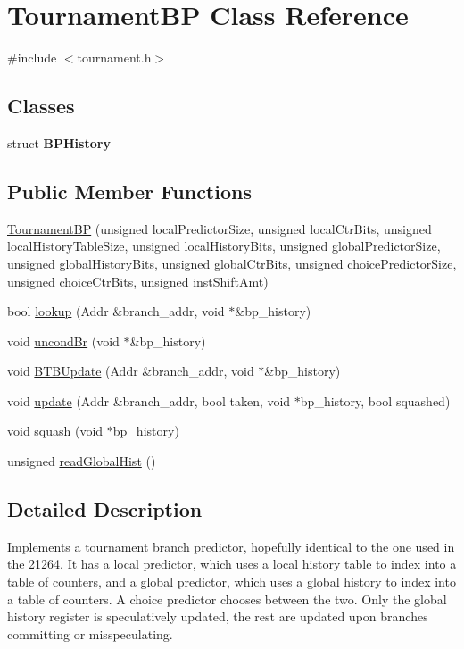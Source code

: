 \hypertarget{classTournamentBP}{
\section{TournamentBP Class Reference}
\label{classTournamentBP}
}


{\ttfamily \#include $<$tournament.h$>$}

\subsection*{Classes}
\begin{DoxyCompactItemize}
\item 
struct {\bfseries BPHistory}
\end{DoxyCompactItemize}
\subsection*{Public Member Functions}
\begin{DoxyCompactItemize}
\item 
\hyperlink{classTournamentBP_a139b9b75152644b3b9359290140458a0}{TournamentBP} (unsigned localPredictorSize, unsigned localCtrBits, unsigned localHistoryTableSize, unsigned localHistoryBits, unsigned globalPredictorSize, unsigned globalHistoryBits, unsigned globalCtrBits, unsigned choicePredictorSize, unsigned choiceCtrBits, unsigned instShiftAmt)
\item 
bool \hyperlink{classTournamentBP_a493edbed2253cdfcda936f4dcda80df0}{lookup} (Addr \&branch\_\-addr, void $\ast$\&bp\_\-history)
\item 
void \hyperlink{classTournamentBP_a7326c97464700d2ade3996ccf0d8d4b4}{uncondBr} (void $\ast$\&bp\_\-history)
\item 
void \hyperlink{classTournamentBP_a58d163a5d49b0c7313dbaffd3738283e}{BTBUpdate} (Addr \&branch\_\-addr, void $\ast$\&bp\_\-history)
\item 
void \hyperlink{classTournamentBP_a3c4515cdaf3778811b03b74bf381a3f8}{update} (Addr \&branch\_\-addr, bool taken, void $\ast$bp\_\-history, bool squashed)
\item 
void \hyperlink{classTournamentBP_acf02d96a4a353442c055d3109e1bf1d2}{squash} (void $\ast$bp\_\-history)
\item 
unsigned \hyperlink{classTournamentBP_a09794f569c803909afa2677e16b993f4}{readGlobalHist} ()
\end{DoxyCompactItemize}


\subsection{Detailed Description}
Implements a tournament branch predictor, hopefully identical to the one used in the 21264. It has a local predictor, which uses a local history table to index into a table of counters, and a global predictor, which uses a global history to index into a table of counters. A choice predictor chooses between the two. Only the global history register is speculatively updated, the rest are updated upon branches committing or misspeculating. 


